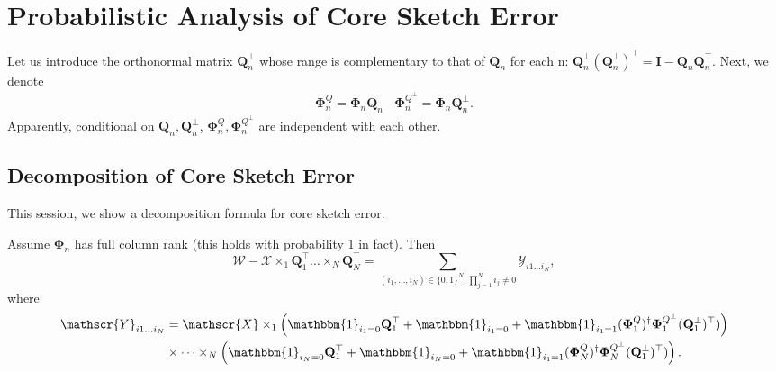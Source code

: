 \section{Probabilistic Analysis of Core Sketch Error}
Let us introduce the orthonormal matrix $\mathbf{Q}_n^\bot$ whose range is complementary to that of $\mathbf{Q}_n$ for each n: $\mathbf{Q}_n^\bot (\mathbf{Q}_n^\bot)^\top = \mathbf{I} - \mathbf{Q}_n\mathbf{Q}_n^\top$. Next, we denote 
\begin{equation}
\begin{aligned}
\mathbf{\Phi}_n^Q = \mathbf{\Phi}_n \mathbf{Q}_n  ~~~~\mathbf{\Phi}_n^{Q^\bot} = \mathbf{\Phi}_n \mathbf{Q}_n^\bot.  
\end{aligned}
\end{equation}
Apparently, conditional on $\mathbf{Q}_n, \mathbf{Q}_n^\bot$, $\mathbf{\Phi}_n^Q, \mathbf{\Phi}_n^{Q^\bot}$ are independent with each other. 


\subsection{Decomposition of Core Sketch Error}
This session, we show a decomposition formula for core sketch error.  
\begin{lem}
\label{lem:core_error_decomposition}
Assume $\mathbf{\Phi}_n$ has full column rank (this holds with probability 1 in fact). Then
\begin{equation}
\mathscr{W} - \mathscr{X}\times_1 \mathbf{Q}_1^\top \dots \times_N \mathbf{Q}_N^\top = 
\sum_{(i_1,\dots, i_N) \in \{0,1\}^N, \prod_{j=1}^N i_j \neq 0} \mathscr{Y}_{i1\dots i_N}, 
\end{equation}
where 
\begin{equation}
\label{eq:def_each_part}
\begin{aligned}
\mathscr{Y}_{i1\dots i_N} &= \mathscr{X}\times_1 \left(\mathbbm{1}_{i_1=0}\mathbf{Q}_1^\top + \mathbbm{1}_{i_1=0}+\mathbbm{1}_{i_1=1}(\mathbf{\Phi}_1^Q)^\dag  \mathbf{\Phi}_1^{Q^\bot}(\mathbf{Q}_1^\bot)^\top) \right)\\
&\times \dots \times_N \left(\mathbbm{1}_{i_N=0}\mathbf{Q}_1^\top + \mathbbm{1}_{i_N=0}+\mathbbm{1}_{i_1=1}(\mathbf{\Phi}_N^Q)^\dag  \mathbf{\Phi}_N^{Q^\bot}(\mathbf{Q}_1^\bot)^\top) \right).
\end{aligned}
\end{equation}
\end{lem}


